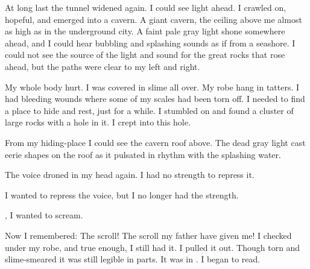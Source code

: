 \documentclass
  [a4paper,
   12pt,
   oneside
  ]%
  {article}
\begin{document}



At long last the tunnel widened again. 
I could see light ahead. 
I crawled on, hopeful, and emerged into a cavern. 
A giant cavern, the ceiling above me almost as high as in the underground city. 
A faint pale gray light shone somewhere ahead, and I could hear bubbling and splashing sounds as if from a seashore. 
I could not see the source of the light and sound for the great rocks that rose ahead, but the paths were clear to my left and right. 

My whole body hurt. 
I was covered in slime all over. 
My robe hang in tatters. 
I had bleeding wounds where some of my scales had been torn off. 
I needed to find a place to hide and rest, just for a while.
I stumbled on and found a cluster of large rocks with a hole in it.
I crept into this hole. 

From my hiding-place I could see the cavern roof above. 
The dead gray light cast eerie shapes on the roof as it pulsated in rhythm with the splashing water. 

The voice droned in my head again. 
I had no strength to repress it. 


I wanted to repress the voice, but I no longer had the strength.


, I wanted to scream. 




Now I remembered: 
The scroll! 
The scroll my father have given me!
I checked under my robe, and true enough, I still had it. 
I pulled it out. 
Though torn and slime-smeared it was still legible in parts. 
It was in \Draconic. 
I began to read. 
\end{document}
